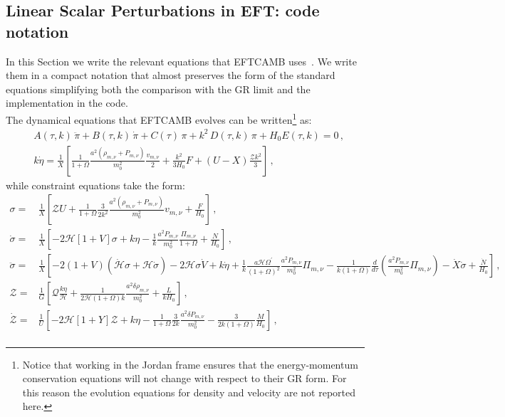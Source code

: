 \documentclass[prd,nofootinbib,showpacs]{revtex4}
\def\l{\left}
\def\r{\right}
\def\f{\frac}
\def\hub{{\mathcal H}}
\begin{document}
{\subsection{Linear Scalar Perturbations in EFT: code notation} \label{SubSec:EFTPe}
%
In this Section we write the relevant equations that EFTCAMB uses~\cite{Ma:1995ey}. We write them in a compact notation that almost preserves the form of the standard equations simplifying both the comparison with the GR limit and the implementation in the code. \\
The dynamical equations that EFTCAMB evolves can be written\footnote{Notice that working in the Jordan frame ensures that the energy-momentum conservation equations 
will not change with respect to their GR form. For this reason the evolution equations for density and velocity are not reported here.} as:
%
\begin{align}
& A(\tau,k)\,\ddot{\pi} + B(\tau,k)\,\dot{\pi} + C(\tau)\,\pi + k^2\,D(\tau,k)\,\pi + H_0 E(\tau,k) =0 \label{Eq:PiFieldEquation} \,,\\
& k\dot{\eta} = \f{1}{X}\l[\frac{1}{1+\Omega} \frac{a^2(\rho_{m,\nu}+P_{m,\nu})}{m_0^2}\frac{v_{m,\nu}}{2} + \frac{k^2}{3H_0}F +(U-X)\f{\mathcal{Z}k^2}{3}\r]   \label{Eq:EtaEquation}\,,
\end{align}
%
while constraint equations take the form:
%
\begin{align}
\sigma =&\f{1}{X}\l[ \mathcal{Z}U + \frac{1}{1+\Omega}\frac{3}{2k^2}\frac{a^2(\rho_{m,\nu}+P_{m,\nu})}{m_0^2}v_{m,\nu} + \frac{{F}}{H_0}\r] \label{Eq:SigmaEquation}\,,\\
%
\dot{\sigma} =&\f{1}{X}\l[ -2\mathcal{H}\l[1+V\r]\sigma  + k \eta-\frac{1}{k}\frac{a^2P_{m,\nu}}{m_0^2}\frac{\Pi_{m,\nu}}{1+\Omega} +\f{N}{H_0}\r] \label{Eq:SigmadotEquation}\,,\\
%
\ddot{\sigma} =& \f{1}{X}\l[ -2\l(1+V \r)\l(\dot{\mathcal{H}}\sigma +\hub \dot{\sigma} \r) -2\hub \sigma \dot{V} +k \dot{\eta} +\frac{1}{k}\frac{a \mathcal{H} \Omega^\prime}{(1+\Omega)^2}\frac{a^2P_{m,\nu}}{m_0^2}\Pi_{m,\nu} -\frac{1}{k(1+\Omega)}\frac{d}{d\tau}\left(\frac{a^2P_{m,\nu}}{m_0^2}\Pi_{m,\nu} \right)-\dot{{X}}\dot{\sigma} +\f{\dot{N}}{H_0}\r] \label{Eq:SigmadotdotEquation}\,,\\
%
\mathcal{Z} =& \f{1}{G}\l[\mathcal{Q}\frac{k\eta}{\mathcal{H}} + \frac{1}{2\mathcal{H}(1+\Omega)k}\frac{a^2 \delta\rho_{m,\nu}}{m_0^2} + \frac{{L}}{kH_0} \r] \label{Eq:Zequation}\,,\\
%
\dot{\mathcal{Z}} =&\f{1}{U}\l[ -2 \mathcal{H} \l[1 + Y\r] \mathcal{Z} + k\eta -\frac{1}{1+\Omega}\frac{3}{2k}\frac{a^2\delta P_{m,\nu}}{m_0^2} - \frac{3}{2k(1+\Omega)}\frac{{M}}{H_0}\r] \,,\nonumber \\

\end{align}}
\end{document}
